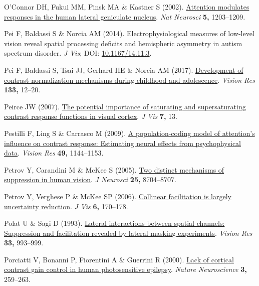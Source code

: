 \documentclass[
  letterpaper,
  DIV=11,
  numbers=noendperiod]{scrartcl}
\newlength{\cslhangindent}
\newenvironment{CSLReferences}[2] %
 {\begin{list}{}{%
  \setlength{\itemindent}{0pt}
  \setlength{\leftmargin}{0pt}
  \setlength{\parsep}{0pt}
  \ifodd #1
   \setlength{\leftmargin}{\cslhangindent}
   \setlength{\itemindent}{-1\cslhangindent}
  \fi
  \setlength{\itemsep}{#2\baselineskip}}}
 {\end{list}}
\begin{document}
\begin{CSLReferences}{1}{1}
O'Connor DH, Fukui MM, Pinsk MA \& Kastner S (2002).
\href{https://doi.org/10.1038/nn957}{Attention modulates responses in
the human lateral geniculate nucleus}. \emph{Nat Neurosci} \textbf{5,}
1203--1209.

Pei F, Baldassi S \& Norcia AM (2014). Electrophysiological measures of
low-level vision reveal spatial processing deficits and hemispheric
asymmetry in autism spectrum disorder. \emph{J Vis}; DOI:
\href{https://doi.org/10.1167/14.11.3}{10.1167/14.11.3}.

Pei F, Baldassi S, Tsai JJ, Gerhard HE \& Norcia AM (2017).
\href{https://doi.org/10.1016/j.visres.2016.03.010}{Development of
contrast normalization mechanisms during childhood and adolescence}.
\emph{Vision Res} \textbf{133,} 12--20.

Peirce JW (2007). \href{https://doi.org/10.1167/7.6.13}{The potential
importance of saturating and supersaturating contrast response functions
in visual cortex}. \emph{J Vis} \textbf{7,} 13.

Pestilli F, Ling S \& Carrasco M (2009).
\href{https://doi.org/10.1016/j.visres.2008.09.018}{A population-coding
model of attention's influence on contrast response: Estimating neural
effects from psychophysical data}. \emph{Vision Res} \textbf{49,}
1144--1153.

Petrov Y, Carandini M \& McKee S (2005).
\href{https://doi.org/10.1523/JNEUROSCI.2871-05.2005}{Two distinct
mechanisms of suppression in human vision}. \emph{J Neurosci}
\textbf{25,} 8704--8707.

Petrov Y, Verghese P \& McKee SP (2006).
\href{https://doi.org/10.1167/6.2.8}{Collinear facilitation is largely
uncertainty reduction}. \emph{J Vis} \textbf{6,} 170--178.

Polat U \& Sagi D (1993).
\href{https://doi.org/10.1016/0042-6989(93)90081-7}{Lateral interactions
between spatial channels: Suppression and facilitation revealed by
lateral masking experiments}. \emph{Vision Res} \textbf{33,} 993--999.

Porciatti V, Bonanni P, Fiorentini A \& Guerrini R (2000).
\href{https://doi.org/10.1038/72972}{Lack of cortical contrast gain
control in human photosensitive epilepsy}. \emph{Nature Neuroscience}
\textbf{3,} 259--263.


\end{CSLReferences}
\end{document}
